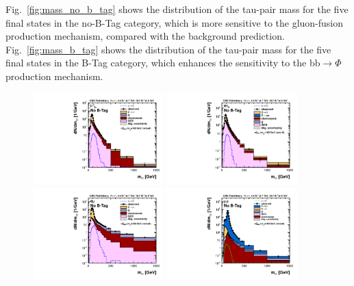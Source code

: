 Fig.~\ref{fig:mass_no_b_tag} shows the distribution of the tau-pair mass for the five final states in the no-B-Tag category, which is  more sensitive to the gluon-fusion production mechanism, compared with the background prediction. 
Fig.~\ref{fig:mass_b_tag} shows the distribution of the tau-pair mass for the five final states in the B-Tag category, which enhances the sensitivity to the bb$\rightarrow \Phi$ production mechanism. 


 
\begin{figure}[!h]\begin{center}
 \includegraphics[width=0.45\textwidth]{MSSM/PLOTS/muTau_nobtag_postfit_7+8TeV_LOG.pdf}
 \includegraphics[width=0.45\textwidth]{MSSM/PLOTS/eleTau_nobtag_postfit_7+8TeV_LOG.pdf}
 \includegraphics[width=0.45\textwidth]{MSSM/PLOTS/emu_nobtag_postfit_7+8TeV_LOG.pdf}
 \includegraphics[width=0.45\textwidth]{MSSM/PLOTS/mumu_nobtag_postfit_7+8TeV_LOG.pdf}

\end{center}
\end{figure}
